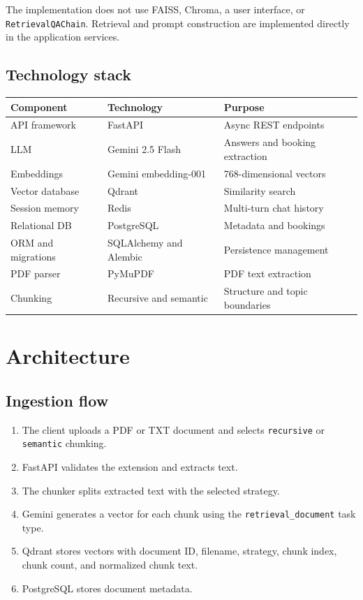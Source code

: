\documentclass[12pt, a4paper]{article}
\begin{document}
The implementation does not use FAISS, Chroma, a user interface, or
\texttt{RetrievalQAChain}. Retrieval and prompt construction are implemented
directly in the application services.

\subsection{Technology stack}

\begin{center}
\begin{tabularx}{\textwidth}{L{3.4cm} L{4.8cm} Y}
    \toprule
    \textbf{Component} & \textbf{Technology} & \textbf{Purpose} \\
    \midrule
    API framework     & FastAPI                 & Async REST endpoints \\
    LLM               & Gemini 2.5 Flash        & Answers and booking extraction \\
    Embeddings        & Gemini embedding-001    & 768-dimensional vectors \\
    Vector database   & Qdrant                  & Similarity search \\
    Session memory    & Redis                   & Multi-turn chat history \\
    Relational DB     & PostgreSQL              & Metadata and bookings \\
    ORM and migrations& SQLAlchemy and Alembic  & Persistence management \\
    PDF parser        & PyMuPDF                 & PDF text extraction \\
    Chunking          & Recursive and semantic  & Structure and topic boundaries \\
    \bottomrule
\end{tabularx}
\end{center}

\section{Architecture}

\subsection{Ingestion flow}

\begin{enumerate}[leftmargin=1.5em]
    \item The client uploads a PDF or TXT document and selects
    \texttt{recursive} or \texttt{semantic} chunking.
    \item FastAPI validates the extension and extracts text.
    \item The chunker splits extracted text with the selected strategy.
    \item Gemini generates a vector for each chunk using the
    \texttt{retrieval\_document} task type.
    \item Qdrant stores vectors with document ID, filename, strategy, chunk
    index, chunk count, and normalized chunk text.
    \item PostgreSQL stores document metadata.
\end{enumerate}
\end{document}
